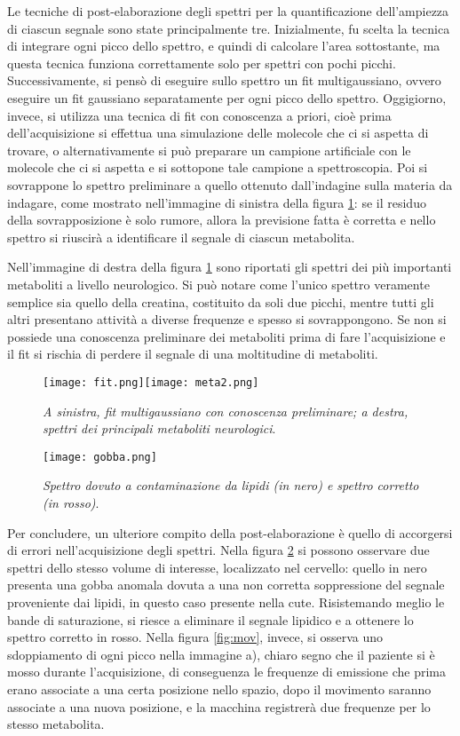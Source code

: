 \documentclass{report}
\newcommand{\figref}[1]{figura \ref{#1}}
\numberwithin{equation}{section}
\numberwithin{figure}{section}
\begin{document}
Le tecniche di post-elaborazione degli spettri per la quantificazione dell'ampiezza di ciascun segnale sono state principalmente tre. Inizialmente, fu scelta la tecnica di integrare ogni picco dello spettro, e quindi di calcolare l'area sottostante, ma questa tecnica funziona correttamente solo per spettri con pochi picchi. Successivamente, si pensò di eseguire sullo spettro un fit multigaussiano, ovvero eseguire un fit gaussiano separatamente per ogni picco dello spettro. Oggigiorno, invece, si utilizza una tecnica di fit con conoscenza a priori, cioè prima dell'acquisizione si effettua una simulazione delle molecole che ci si aspetta di trovare, o alternativamente si può preparare un campione artificiale con le molecole che ci si aspetta e si sottopone tale campione a spettroscopia. Poi si sovrappone lo spettro preliminare a quello ottenuto dall'indagine sulla materia da indagare, come mostrato nell'immagine di sinistra della \figref{fig:fit}: se il residuo della sovrapposizione è solo rumore, allora la previsione fatta è corretta e nello spettro si riuscirà a identificare il segnale di ciascun metabolita.

Nell'immagine di destra della \figref{fig:fit} sono riportati gli spettri dei più importanti metaboliti a livello neurologico. Si può notare come l'unico spettro veramente semplice sia quello della creatina, costituito da soli due picchi, mentre tutti gli altri presentano attività a diverse frequenze e spesso si sovrappongono. Se non si possiede una conoscenza preliminare dei metaboliti prima di fare l'acquisizione e il fit si rischia di perdere il segnale di una moltitudine di metaboliti.

\begin{figure}[htp]
\centering
\texttt{[image: fit.png]}\quad\texttt{[image: meta2.png]}
\caption{\label{fig:fit} \textit{A sinistra, fit multigaussiano con conoscenza preliminare; a destra, spettri dei principali metaboliti neurologici}.}
\end{figure}

\begin{figure}[htp]
\centering
\texttt{[image: gobba.png]}
\caption{\label{fig:gobba} \textit{Spettro dovuto a contaminazione da lipidi (in nero) e spettro corretto (in rosso)}.}
\end{figure}

Per concludere, un ulteriore compito della post-elaborazione è quello di accorgersi di errori nell'acquisizione degli spettri. Nella \figref{fig:gobba} si possono osservare due spettri dello stesso volume di interesse, localizzato nel cervello: quello in nero presenta una gobba anomala dovuta a una non corretta soppressione del segnale proveniente dai lipidi, in questo caso presente nella cute. Risistemando meglio le bande di saturazione, si riesce a eliminare il segnale lipidico e a ottenere lo spettro corretto in rosso.
Nella \figref{fig:mov}, invece, si osserva uno sdoppiamento di ogni picco nella immagine a), chiaro segno che il paziente si è mosso durante l'acquisizione, di conseguenza le frequenze di emissione che prima erano associate a una certa posizione nello spazio, dopo il movimento saranno associate a una nuova posizione, e la macchina registrerà due frequenze per lo stesso metabolita.
\end{document}
